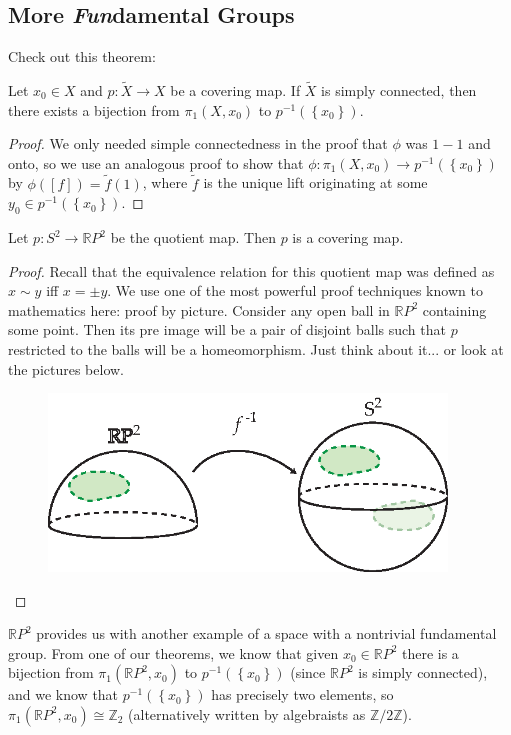 \subsection{More \textit{Fun}damental Groups}
 Check out this theorem:
\begin{theorem}
Let $x_0\in X$ and $p\colon \tilde{X}\to X$ be a covering map. If $\tilde{X}$ is simply connected, then there exists a bijection from $\pi_1(X,x_0)$ to $p^{-1}(\left\{x_0\right\})$.
\end{theorem}
\begin{proof}
We only needed simple connectedness in the proof that $\phi$ was $1-1$ and onto, so we use an analogous proof to show that $\phi \colon \pi_1(X,x_0)\to p^{-1}(\left\{x_0\right\})$ by $\phi([f])=\tilde{f}(1)$, where $\tilde{f}$ is the unique lift originating at some $y_0\in p^{-1}(\left\{x_0\right\})$. 
\end{proof}

\begin{theorem}
Let $p\colon S^2\to \mathbb{R}P^2$ be the quotient map. Then $p$ is a covering map.
\end{theorem}
\begin{proof}
Recall that the equivalence relation for this quotient map was defined as $x\sim y$ iff $x=\pm y$. We use one of the most powerful proof techniques known to mathematics here: proof by picture. Consider any open ball in $\mathbb{R}P^2$ containing some point. Then its pre image will be a pair of disjoint balls such that $p$ restricted to the balls will be a homeomorphism. Just think about it... or look at the pictures below.

\begin{figure}[ht!]
    \centering
    \includegraphics[width=300pt]{images/covering_spaces/rp2_quotient}
\end{figure}
\end{proof}

$\mathbb{R}P^2$ provides us with another example of a space with a nontrivial fundamental group. From one of our theorems, we know that given $x_0\in \mathbb{R}P^2$ there is a bijection from $\pi_1(\mathbb{R}P^2,x_0)$ to $p^{-1}(\left\{x_0\right\})$ (since $\mathbb{R}P^2$ is simply connected), and we know that $p^{-1}(\left\{x_0\right\})$ has precisely two elements, so $\pi_1(\mathbb{R}P^2,x_0)\cong \mathbb{Z}_2$ (alternatively written by algebraists as $\mathbb{Z}/ 2\mathbb{Z}$).



